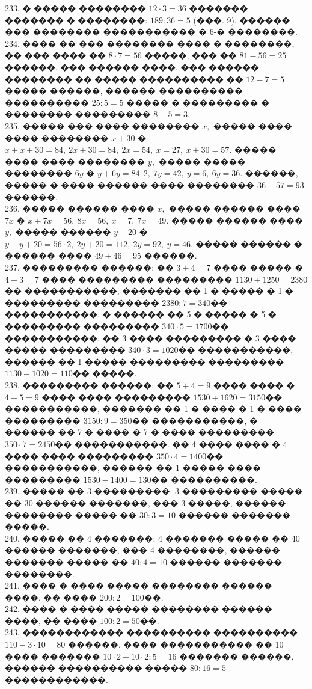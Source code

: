 \documentclass[12pt]{article}
\begin{document}
233. � ����� �������� $12\cdot3=36$ �������. ������� � ��������: $189:36=5$ (���. 9), ������ ��� �������� ����������� � 6-�  ��������.\\
234. ���� �� ��� �������� ���� � ��������, �� ��� ���� �� $8\cdot7=56$ �����, ��� �� $81-56=25$ ������, ��� ������ ����. ��� ������ �������� �� ����� ���������� �� $12-7=5$ ����� ������, ������ ���������� ���������� $25:5=5$ ����� � ��������� � �������� ��������� $8-5=3.$\\
235. ����� ��� ���� �������� $x,$ ����� ���� ���� �������� $x+30$ � $x+x+30=84,\ 2x+30=84,\ 2x=54,\ x=27,\ x+30=57.$ ����� ���� ���� �������� $y,$ ����� ����� �������� $6y$ � $y+6y=84:2,\ 7y=42,\ y=6,\ 6y=36.$ ������, ����� � ���� ������ ���� �������� $36+57=93$ ������.\\
236. ����� ������ ���� $x,$ ����� ������ ���� $7x$ � $x+7x=56,\ 8x=56,\ x=7,\ 7x=49.$ ����� ������ ���� $y,$ ����� ������ $y+20$ � $y+y+20=56\cdot2,\ 2y+20=112,\ 2y=92,\ y=46.$ ����� ������ � ������ ���� $49+46=95$ ������.\\
237. ��������� ������: �� $3+4=7$ ���� ����� � $4+3=7$ ���� ��������� ��������� $1130+1250=2380$�� �����������, ������� �� 1 � ����� � 1 � ��������� ��������� $2380:7=340$�� �����������, � ������ �� 5 � ����� � 5 � ��������� ��������� $340\cdot5=1700$�� �����������. �� 3 ���� ��������� � 3 ���� ����� ��������� $340\cdot3=1020$�� �����������, ������ �� 1 ����� ��������� ��������� $1130-1020=110$�� �����.\\
238. ��������� ������: �� $5+4=9$ ���� ���� � $4+5=9$ ���� ���� ��������� $1530+1620=3150$�� �����������, ������� �� 1 � ���� � 1 � ���� ��������� $3150:9=350$�� �����������, � ������ �� 7 � ���� � 7 � ���� ��������� $350\cdot7=2450$�� �����������. �� 4 ���� ���� � 4 ���� ���� ��������� $350\cdot4=1400$�� �����������, ������ �� 1 ����� ���� ��������� $1530-1400=130$�� ����������.\\
239. ����� �� 3 ���������: 3 ��������� ����� �� 30 ������ �������, ��� 3 �����, ������ �������� ����� �� $30:3=10$ ������ ������� �����.\\
240. ����� �� 4 �������: 4 ������� ����� �� 40 ������ �������, ��� 4 ��������, ������ ������� ����� �� $40:4=10$ ������ ������� ��������.\\
241. ���� � ���� ����� �������� ������ ����, �� ���� $200:2=100$��.\\
242. ���� � ���� ����� �������� ������ ����, �� ���� $100:2=50$��.\\
243. ������������ ���������� ���������� $110-3\cdot10=80$ ������. ���� ����������� �� 10 ���� ������� $10\cdot2-10\cdot2:5=16$ ������� ������, ������ ���������� ����� $80:16=5$ ������������.\\
\end{document}
